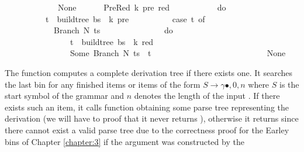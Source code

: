 \begin{isabellebody}
\ \ \ \ \ \ \ \ \ \ {\isacharbar}{\kern0pt}\ {\isacharunderscore}{\kern0pt}\ {\isasymRightarrow}\ None\ {\isacharbraceright}{\kern0pt}{\isacharparenright}{\kern0pt}\isanewline
\ \ \ \ {\isacharbar}{\kern0pt}\ PreRed\ {\isacharparenleft}{\kern0pt}k{\isacharprime}{\kern0pt}{\isacharcomma}{\kern0pt}\ pre{\isacharcomma}{\kern0pt}\ red{\isacharparenright}{\kern0pt}\ {\isacharunderscore}{\kern0pt}\ {\isasymRightarrow}\ {\isacharparenleft}{\kern0pt}\isanewline
\ \ \ \ \ \ \ \ do\ {\isacharbraceleft}{\kern0pt}\isanewline
\ \ \ \ \ \ \ \ \ \ t\ {\isasymleftarrow}\ build{\isacharunderscore}{\kern0pt}tree{\isacharprime}{\kern0pt}\ bs\ {\isasymomega}\ k{\isacharprime}{\kern0pt}\ pre{\isacharsemicolon}{\kern0pt}\isanewline
\ \ \ \ \ \ \ \ \ \ case\ t\ of\isanewline
\ \ \ \ \ \ \ \ \ \ \ \ Branch\ N\ ts\ {\isasymRightarrow}\isanewline
\ \ \ \ \ \ \ \ \ \ \ \ \ \ do\ {\isacharbraceleft}{\kern0pt}\isanewline
\ \ \ \ \ \ \ \ \ \ \ \ \ \ \ \ t\ {\isasymleftarrow}\ build{\isacharunderscore}{\kern0pt}tree{\isacharprime}{\kern0pt}\ bs\ {\isasymomega}\ k\ red{\isacharsemicolon}{\kern0pt}\isanewline
\ \ \ \ \ \ \ \ \ \ \ \ \ \ \ \ Some\ {\isacharparenleft}{\kern0pt}Branch\ N\ {\isacharparenleft}{\kern0pt}ts\ {\isacharat}{\kern0pt}\ {\isacharbrackleft}{\kern0pt}t{\isacharbrackright}{\kern0pt}{\isacharparenright}{\kern0pt}{\isacharparenright}{\kern0pt}\isanewline
\ \ \ \ \ \ \ \ \ \ \ \ \ \ {\isacharbraceright}{\kern0pt}\isanewline
\ \ \ \ \ \ \ \ \ \ {\isacharbar}{\kern0pt}\ {\isacharunderscore}{\kern0pt}\ {\isasymRightarrow}\ None\ {\isacharbraceright}{\kern0pt}{\isacharparenright}{\kern0pt}{\isacharparenright}{\kern0pt}{\isacharparenright}{\kern0pt}{\isachardoublequoteclose}%
\begin{isamarkuptext}%
The function  computes a complete derivation tree if there exists one. It searches the last bin for any finished items or items of the form
$S \rightarrow \gamma \bullet, 0, n$ where $S$ is the start symbol of the grammar \isa{{\isasymG}} and $n$ denotes
the length of the input \isa{{\isasymomega}}. If there exists such an item, it calls function 
obtaining some parse tree representing the derivation  (we will have to proof that it never returns ),
otherwise it returns  since there cannot exist a valid parse tree due to the correctness
proof for the Earley bins of Chapter \ref{chapter:3} if the argument  was constructed by the

\end{isamarkuptext}
\end{isabellebody}
